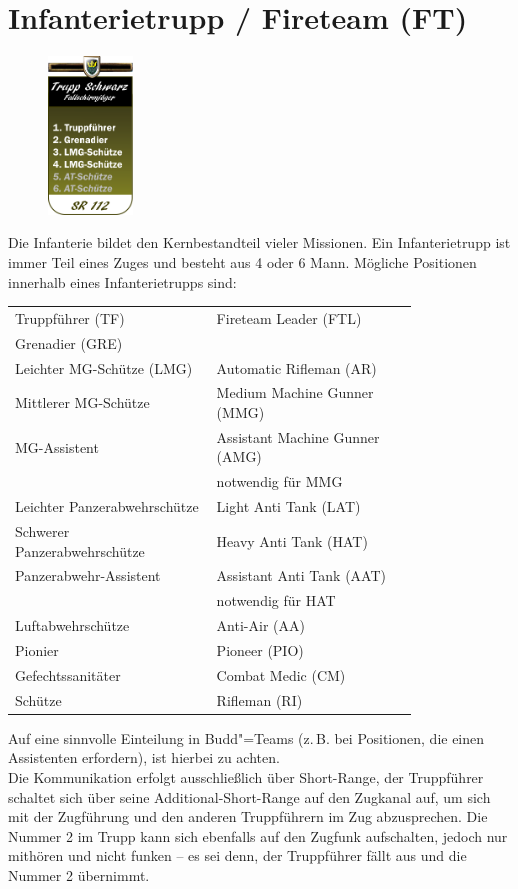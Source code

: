 \section{Infanterietrupp / Fireteam (FT)}
\begin{figure}
	\vspace{-50pt}
	\centering 
	\includegraphics[width=0.2\textwidth]{./img/truppenordnung/infanterie/infanterie}
\end{figure}
Die Infanterie bildet den Kernbestandteil vieler Missionen. Ein Infanterietrupp ist immer Teil eines Zuges und besteht aus 4 oder 6 Mann. Mögliche Positionen innerhalb eines Infanterietrupps sind:
\vspace{3.5cm}
\begin{longtable}{@{}P{0.4\linewidth}P{0.4\linewidth}@{}}

	\toprule
	Truppführer (TF) & Fireteam Leader (FTL)\\
	Grenadier (GRE) & \\
	Leichter MG-Schütze (LMG) & Automatic Rifleman (AR)\\
	Mittlerer MG-Schütze & Medium Machine Gunner (MMG) \\
	MG-Assistent & Assistant Machine Gunner (AMG)\\ 
	& notwendig für MMG\\
	Leichter Panzerabwehrschütze & Light Anti Tank (LAT)\\
	Schwerer Panzerabwehrschütze & Heavy Anti Tank (HAT)\\
	Panzerabwehr-Assistent & Assistant Anti Tank (AAT)\\ 
	& notwendig für HAT\\
	Luftabwehrschütze & Anti-Air (AA)\\
	Pionier & Pioneer (PIO)\\
	Gefechtssanitäter & Combat Medic (CM)\\
	Schütze & Rifleman (RI)\\			
	\bottomrule					
\end{longtable}


Auf eine sinnvolle Einteilung in Budd"=Teams (z.\,B. bei Positionen, die einen Assistenten erfordern), ist hierbei zu achten.\\
Die Kommunikation erfolgt ausschließlich über Short-Range, der Truppführer schaltet sich über seine Additional-Short-Range auf den Zugkanal auf, um sich mit der Zugführung und den anderen Truppführern im Zug abzusprechen. Die Nummer 2 im Trupp kann sich ebenfalls auf den Zugfunk aufschalten, jedoch nur mithören und nicht funken -- es sei denn, der Truppführer fällt aus und die Nummer 2 übernimmt.